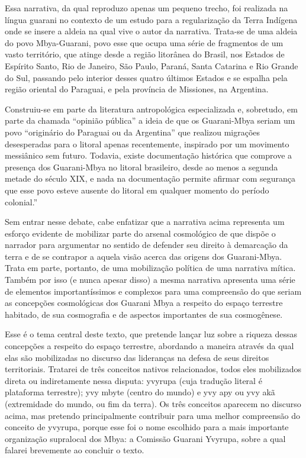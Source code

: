\bigskip
\bigskip
Essa narrativa, da qual reproduzo apenas um pequeno trecho, foi
realizada na língua guarani no contexto de um estudo para a
regularização da Terra Indígena onde se insere a aldeia na qual vive o
autor da narrativa. Trata-se de uma aldeia do povo Mbya-Guarani, povo
esse que ocupa uma série de fragmentos de um vasto território, que
atinge desde a região litorânea do Brasil, nos Estados de Espírito
Santo, Rio de Janeiro, São Paulo, Paraná, Santa Catarina e Rio Grande
do Sul, passando pelo interior desses quatro últimos Estados e se
espalha pela região oriental do Paraguai, e pela província de
Missiones, na Argentina.

Construiu-se em parte da literatura antropológica especializada e,
sobretudo, em parte da chamada ``opinião pública'' a ideia de que os
Guarani-Mbya seriam um povo ``originário do Paraguai ou da Argentina''
que realizou migrações desesperadas para o litoral apenas recentemente,
inspirado por um movimento messiânico sem futuro. Todavia, existe
documentação histórica que comprove a presença dos Guarani-Mbya no
litoral brasileiro, desde ao menos a segunda metade do século XIX, e
nada na documentação permite afirmar com segurança que esse povo esteve
ausente do litoral em qualquer momento do período colonial.''

Sem entrar nesse debate, cabe enfatizar que a narrativa acima representa
um esforço evidente de mobilizar parte do arsenal cosmológico de que
dispõe o narrador para argumentar no sentido de defender seu direito à
demarcação da terra e de se contrapor a aquela visão acerca das origens
dos Guarani-Mbya. Trata em parte, portanto, de uma mobilização política
de uma narrativa mítica. Também por isso (e nunca apesar disso) a mesma
narrativa apresenta uma série de elementos importantíssimos e complexos
para uma compreensão do que seriam as concepções cosmológicas dos
Guarani Mbya a respeito do espaço terrestre habitado, de sua
cosmografia e de aspectos importantes de sua cosmogênese.

Esse é o tema central deste texto, que pretende lançar luz sobre a
riqueza dessas concepções a respeito do  espaço terrestre,  abordando a
maneira através da qual elas são mobilizadas no discurso das lideranças
na defesa de seus direitos territoriais. Tratarei de três conceitos
nativos relacionados, todos eles mobilizados direta ou indiretamente
nessa disputa: yvyrupa (cuja tradução literal é plataforma terrestre);
yvy mbyte (centro do mundo) e yvy apy ou yvy akã (extremidade do mundo,
ou fim da terra). Os três conceitos aparecem no discurso acima, mas
pretendo principalmente contribuir para uma melhor compreensão do
conceito de yvyrupa, porque esse foi o nome escolhido para a mais
importante organização supralocal dos Mbya: a Comissão Guarani Yvyrupa,
sobre a qual falarei brevemente ao concluir o texto.

